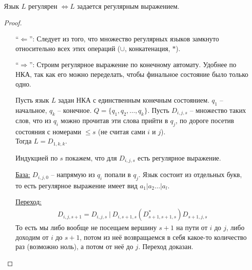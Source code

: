 \begin{theorem}
    Язык $L$ регулярен $\Longleftrightarrow L$ задается регулярным выражением.
\end{theorem}
\begin{proof} \quad 
    
    \begin{enumerate}
        \item[``$\Leftarrow$'':] Следует из того, что множество регулярных языков замкнуто относительно всех этих операций ($\cup$, конкатенация, $*$).
        \item[``$\Rightarrow$'':] Строим регулярное выражение по конечному автомату. Удобнее по НКА, так как его можно переделать, чтобы финальное состояние было только одно.
        
        Пусть язык $L$ задан НКА с единственным конечным состоянием. $q_1$ -- начальное, $q_k$ -- конечное. $Q = \{q_1, q_2, \dots, q_k\}$.
        Пусть $D_{i,j,s}$ -- множество таких слов, что из $q_i$ можно прочитав эти слова прийти в $q_j$, по дороге посетив состояния с номерами $\leq s$ (не считая сами $i$ и $j$).\\
        Тогда $L = D_{1, k, k}$. 
    
        Индукцией по $s$ покажем, что для $D_{i,j,s}$ есть регулярное выражение.
        
        \quad \underline{База:}
        $D_{i,j,0}$ -- напрямую из $q_i$ попали в $q_j$. Язык состоит из отдельных букв, то есть регулярное выражение имеет вид $a_1 | a_2 \dots | a_l$. 
    
        \quad \underline{Переход:}
        \begin{gather*}
            D_{i, j, s+1} = D_{i, j, s}\ |\ D_{i, s+1, s}(D_{s+1, s+1, s}^*)D_{s+1, j, s}
        \end{gather*} 
        То есть мы либо вообще не посещаем вершину $s+1$ на пути от $i$ до $j$, либо доходим от $i$ до $s+1$, потом из неё возвращаемся в себя какое-то количество раз (возможно ноль), а потом от неё до $j$. Переход доказан.
    \end{enumerate}
\end{proof}

